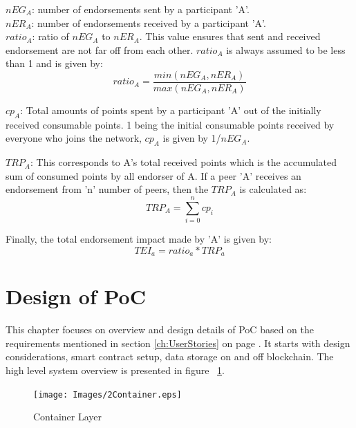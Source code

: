 \textit{$nEG_A$}: number of endorsements sent by a participant 'A'. \\

\textit{$nER_A$}: number of endorsements received by a participant 'A'. \\

\textit{$ratio_A$}: ratio of \textit{$nEG_A$} to \textit{$nER_A$}. This value
ensures that sent and received endorsement are not far off from  each other.
\textit{$ratio_A$} is always assumed to be less than 1 and is given by: 
\begin{equation}
	ratio_A = \frac{min(nEG_A,nER_A)}{max(nEG_A,nER_A)} 
\end{equation}

\textit{$cp_A$}: Total amounts of points spent by a participant 'A' out of the
initially received consumable points. 1 being the initial consumable points
received by everyone who joins the network, \textit{$cp_A$} is given by
1/\textit{$nEG_A$}.

\textit{$TRP_A$}: This corresponds to A's total received points which is the
accumulated sum of consumed points by all endorser of A.  If a peer 'A'
receives an endorsement from 'n' number of peers, then the \textit{$TRP_A$} is
calculated as:
\begin{equation}
	TRP_A  = \sum_{i=0}^{n}cp_{i}
\end{equation}

Finally, the total endorsement impact made by 'A' is given by: \\
\begin{equation}
	TEI_a = ratio_a * TRP_a
\end{equation}

%

\section{Design of PoC}
This chapter focuses on overview and design details of PoC based on the
requirements mentioned in section \ref{ch:UserStories} on page
\pageref{ch:UserStories}. It starts with design considerations, smart contract
setup, data storage on and off blockchain. The high level system overview is
presented in figure ~\ref{fig:SystemContainer}. 

\begin{figure}
	\texttt{[image: Images/2Container.eps]}
	\caption{Container Layer}
	\label{fig:SystemContainer}
\end{figure}

